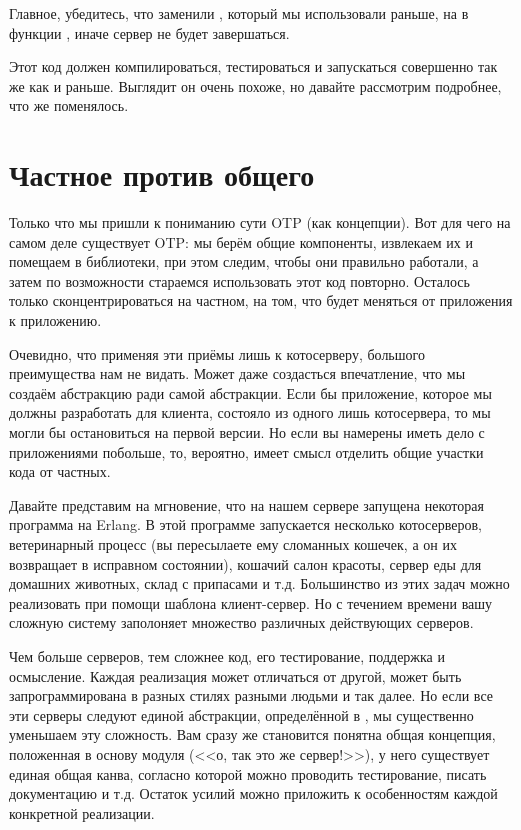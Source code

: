 Главное, убедитесь, что заменили , который мы использовали раньше, на  в функции , иначе сервер не будет завершаться.

Этот код должен компилироваться, тестироваться и запускаться совершенно так же как и раньше.
Выглядит он очень похоже, но давайте рассмотрим подробнее, что же поменялось.
\section{Частное против общего}
\label{specific-vs-generic}
Только что мы пришли к пониманию сути OTP (как концепции).
Вот для чего на самом деле существует OTP: мы берём общие компоненты, извлекаем их и помещаем в библиотеки, при этом следим, чтобы они правильно работали, а затем по возможности стараемся использовать этот код повторно.
Осталось только сконцентрироваться на частном, на том, что будет меняться от приложения к приложению.

Очевидно, что применяя эти приёмы лишь к котосерверу, большого преимущества нам не видать.
Может даже создасться впечатление, что мы создаём абстракцию ради самой абстракции.
Если бы приложение, которое мы должны разработать для клиента, состояло из одного лишь котосервера, то мы могли бы остановиться на первой версии.
Но если вы намерены иметь дело с приложениями побольше, то, вероятно, имеет смысл отделить общие участки кода от частных.

Давайте представим на мгновение, что на нашем сервере запущена некоторая программа на Erlang.
В этой программе запускается несколько котосерверов, ветеринарный процесс (вы пересылаете ему сломанных кошечек, а он их возвращает в исправном состоянии), кошачий салон красоты, сервер еды для домашних животных, склад с припасами и т.д.
Большинство из этих задач можно реализовать при помощи шаблона клиент\--сервер.
Но с течением времени вашу сложную систему заполоняет множество различных действующих серверов.

Чем больше серверов, тем сложнее код, его тестирование, поддержка и осмысление.
Каждая реализация может отличаться от другой, может быть запрограммирована в разных стилях разными людьми и так далее.
Но если все эти серверы следуют единой абстракции, определённой в , мы существенно уменьшаем эту сложность.
Вам сразу же становится понятна общая концепция, положенная в основу модуля (<<о, так это же сервер!>>), у него существует единая общая канва, согласно которой можно проводить тестирование, писать документацию и т.д.
Остаток усилий можно приложить к особенностям каждой конкретной реализации.

